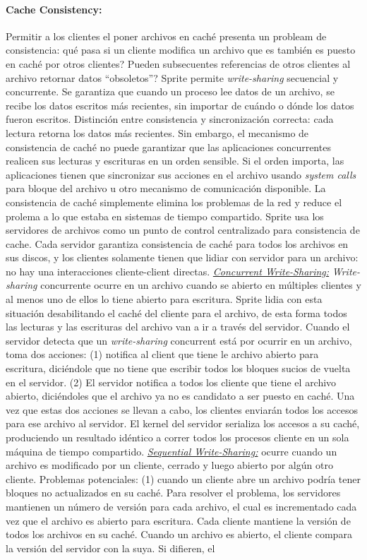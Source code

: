 \paragraph{\textnormal{\textbf{Cache Consistency:}}}
Permitir a los clientes el poner archivos en caché presenta un probleam de consistencia: qué pasa si un cliente modifica un archivo que es también es puesto en caché por otros clientes? Pueden subsecuentes referencias de otros clientes al archivo retornar datos ``obsoletos''? Sprite permite \emph{write-sharing} secuencial y concurrente. Se garantiza que cuando un proceso lee datos de un archivo, se recibe los datos escritos más recientes, sin importar de cuándo o dónde los datos fueron escritos. Distinción entre consistencia y sincronización correcta: cada lectura retorna los datos más recientes. Sin embargo, el mecanismo de consistencia de caché no puede garantizar que las aplicaciones concurrentes realicen sus lecturas y escrituras en un orden sensible. Si el orden importa, las aplicaciones tienen que sincronizar sus acciones en el archivo usando \emph{system calls} para bloque del archivo u otro mecanismo de comunicación disponible. La consistencia de caché simplemente elimina los problemas de la red y reduce el prolema a lo que estaba en sistemas de tiempo compartido. Sprite usa los servidores de archivos como un punto de control centralizado para consistencia de cache. Cada servidor garantiza consistencia de caché para todos los archivos en sus discos, y los clientes solamente tienen que lidiar con servidor para un archivo: no hay una interacciones cliente-client directas. \underline{\emph{Concurrent Write-Sharing:}} \emph{Write-sharing} concurrente ocurre en un archivo cuando se abierto en múltiples clientes y al menos uno de ellos lo tiene abierto para escritura. Sprite lidia con esta situación desabilitando el caché del cliente para el archivo, de esta forma todos las lecturas y las escrituras del archivo van a ir a través del servidor. Cuando el servidor detecta que un \emph{write-sharing} concurrent está por ocurrir en un archivo, toma dos acciones: (1) notifica al client que tiene le archivo abierto para escritura, diciéndole que no tiene que escribir todos los bloques sucios de vuelta en el servidor. (2) El servidor notifica a todos los cliente que tiene el archivo abierto, diciéndoles que el archivo ya no es candidato a ser puesto en caché. Una vez que estas dos acciones se llevan a cabo, los clientes enviarán todos los accesos para ese archivo al servidor. El kernel del servidor serializa los accesos a su caché, produciendo un resultado idéntico a correr todos los procesos cliente en un sola máquina de tiempo compartido. \underline{\emph{Sequential Write-Sharing:}} ocurre cuando un archivo es modificado por un cliente, cerrado y luego abierto por algún otro cliente. Problemas potenciales: (1) cuando un cliente abre un archivo podría tener bloques no actualizados en su caché. Para resolver el problema, los servidores mantienen un número de versión para cada archivo, el cual es incrementado cada vez que el archivo es abierto para escritura. Cada cliente mantiene la versión de todos los archivos en su caché. Cuando un archivo es abierto, el cliente compara la versión del servidor con la suya. Si difieren, el 